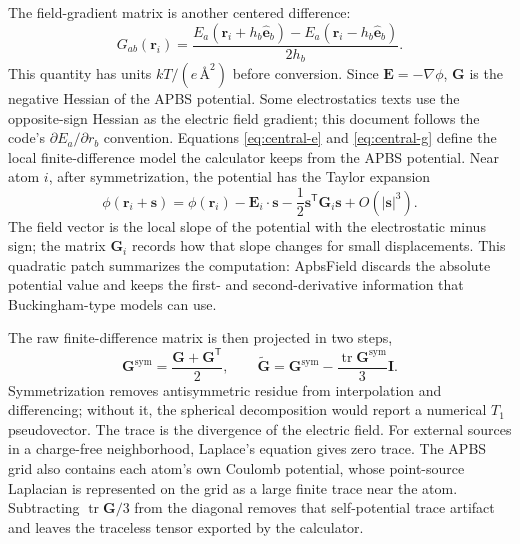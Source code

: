 \documentclass[11pt]{article}
\begin{document}
The field-gradient matrix is another centered difference:
\begin{equation}
  G_{ab}(\bm r_i)
  =
  \frac{
    E_a(\bm r_i+h_b\hat{\bm e}_b)
    -
    E_a(\bm r_i-h_b\hat{\bm e}_b)}
  {2h_b}.
  \label{eq:central-g}
\end{equation}
This quantity has units \(kT/(e\,\si{\angstrom\squared})\) before conversion.
Since \(\bm E=-\nabla\phi\), \(\bm G\) is the negative Hessian of the APBS
potential. Some electrostatics texts use the opposite-sign Hessian as the
electric field gradient; this document follows the code's
\(\partial E_a/\partial r_b\) convention.
Equations \eqref{eq:central-e} and \eqref{eq:central-g} define the local
finite-difference model the calculator keeps from the APBS potential. Near atom
\(i\), after symmetrization, the potential has the Taylor expansion
\begin{equation}
  \phi(\bm r_i+\bm s)
  =
  \phi(\bm r_i)
  - \bm E_i\cdot\bm s
  - \frac{1}{2}\bm s^{\mathsf T}\bm G_i\bm s
  + O(|\bm s|^3).
  \label{eq:taylor}
\end{equation}
The field vector is the local slope of the potential with the electrostatic
minus sign; the matrix \(\bm G_i\) records how that slope changes for small
displacements. This quadratic patch summarizes the computation:
ApbsField discards the absolute potential value and keeps the first- and
second-derivative information that Buckingham-type models can use.

The raw finite-difference matrix is then projected in two steps,
\begin{equation}
  \bm G^{\mathrm{sym}} =
  \frac{\bm G+\bm G^{\mathsf T}}{2},
  \qquad
  \widetilde{\bm G} =
  \bm G^{\mathrm{sym}}
  - \frac{\operatorname{tr}\bm G^{\mathrm{sym}}}{3}\bm I .
  \label{eq:project}
\end{equation}
Symmetrization removes antisymmetric residue from interpolation and differencing;
without it, the spherical decomposition would report a numerical \(T_1\)
pseudovector. The trace is the divergence of the electric field. For external
sources in a charge-free neighborhood, Laplace's equation gives zero trace. The
APBS grid also contains each atom's own Coulomb potential, whose point-source
Laplacian is represented on the grid as a large finite trace near the atom.
Subtracting \(\operatorname{tr}\bm G/3\) from the diagonal removes that
self-potential trace artifact and leaves the traceless tensor exported by the
calculator.
\end{document}
